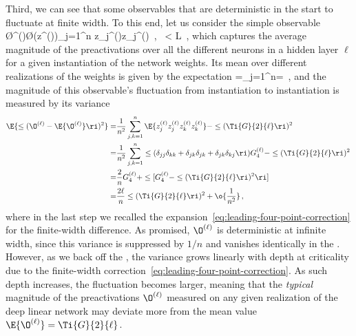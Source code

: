 Third, we can see that some observables that are deterministic in the  start to fluctuate at finite width.
To this end, let us consider the simple observable
\be
\O^{(\ell)}\equiv \O\!\le(z^{(\ell)}\ri)\equiv {}\sum_{j=1}^{n} z_{j}^{(\ell)}z_{j}^{(\ell)}\, , \quad {}\ \ell< L\, ,
\ee
which captures the average magnitude of the preactivations over all the different neurons in a hidden layer $\ell$ for a given instantiation of the network weights. Its mean over different realizations of the weights is given by the expectation
\be
\E{\O^{(\ell)}}=\sum_{j=1}^{n}=\, ,
\ee
and the magnitude of this observable's fluctuation from instantiation to instantiation is measured by its variance
\begin{align}
\E{\le(\O^{(\ell)}-\E{\O^{(\ell)}}\ri)^2}=&\frac{1}{n^2}\sum_{j,k=1}^{n}\E{z_{j}^{(\ell)}z_{j}^{(\ell)}z_{k}^{(\ell)}z_{k}^{(\ell)}}-\le(\Ti{G}{2}{\ell}\ri)^2\, \\
=&\frac{1}{n^2}\sum_{j,k=1}^{n} \le(\delta_{jj}\delta_{kk}+ \delta_{jk}\delta_{jk}+ \delta_{jk}\delta_{kj}\ri)G_4^{(\ell)}-\le(\Ti{G}{2}{\ell}\ri)^2\, \nonumber\\
=&\frac{2}{n}G_4^{(\ell)}+ \le[G_4^{(\ell)}-\le(\Ti{G}{2}{\ell}\ri)^2\ri]\, \nonumber\\
=&\frac{2\ell}{n}\le(\Ti{G}{2}{\ell}\ri)^2+\o{\frac{1}{n^2}}\, ,\nonumber
\end{align}
where in the last step we recalled the expansion~\eqref{eq:leading-four-point-correction} for the finite-width difference.
As promised, $\O^{(\ell)}$ is deterministic at infinite width, since this variance is suppressed by $1/n$ and vanishes identically in the .
However, as we back off the , the variance grows linearly with depth at criticality due to the finite-width correction~\eqref{eq:leading-four-point-correction}.
As such depth increases, the fluctuation becomes larger, meaning that 
 the \emph{typical} magnitude of the preactivations $\O^{(\ell)}$ measured on any given realization of the deep linear network may deviate more from the mean value $\E{\O^{(\ell)}}=\Ti{G}{2}{\ell}$.












